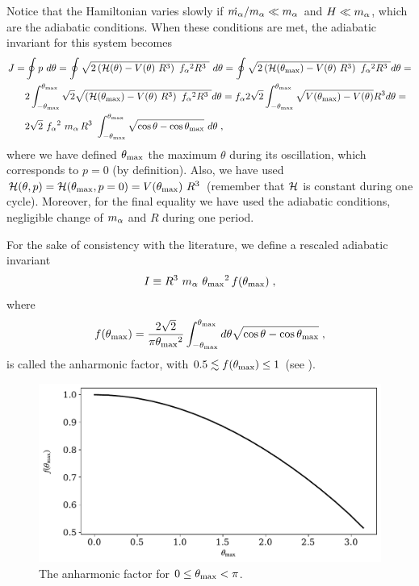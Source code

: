 \documentclass[11pt,a4paper]{article}
\begin{document}
Notice that the Hamiltonian varies slowly if $\dot {m_\alpha{}}/m_\alpha{} \ll m_\alpha{}$ and $H \ll m_\alpha{}$, which are the adiabatic conditions.   When these conditions are met, the adiabatic invariant for this system becomes
%
\begin{eqnarray}
	J = & \oint p \ d \theta = \oint \sqrt{ 2\lrb{ \Ham(\theta) - V(\theta) \ R^3} \ \fa^2 R^3 \ }  \ d \theta  =
	\oint \sqrt{ 2\lrb{ \Ham(\thetamax) - V(\theta) \ R^3} \ \fa^2 R^3 \ } d \theta = \nonumber \\ 
	& 2 \int_{- \thetamax} ^{\thetamax}  \sqrt{2}\sqrt{ \lrb{ \Ham(\thetamax) - V(\theta) \ R^3} \ \fa^2 R^3 \ } d \theta =
	\fa 2 \sqrt{2} \int_{- \thetamax} ^{\thetamax}  \sqrt{ V(\theta_{\rm max}) - V(\theta) } R^{3} d \theta = \nonumber \\
	&2\sqrt{2} \ \fa^2 \ \ma \, R^3 \ \dint_{- \thetamax}^{\thetamax} \sqrt{\cos \theta - \cos \thetamax} \ d \theta  
	\;,
	\label{eq:J_axion_derivation}
\end{eqnarray}
%
where we have defined $\theta_{\rm max}{}$ the maximum $\theta$ during its oscillation, which corresponds to $p=0$ (by definition). Also, we have used $\mathcal{H}(\theta,p) = \mathcal{H}(\theta_{\rm max}{},p=0) =  V(\theta_{\rm max}{}) \ R^3$ (remember that $\mathcal{H}$ is constant during one cycle). Moreover, for the final equality we have used the adiabatic conditions, \ie negligible change of $m_\alpha{}$ and $R$ during one period.
%

For the sake of consistency with the literature, we define a rescaled adiabatic invariant 
%
\begin{equation}
	I \equiv R^3 \ \ma \ \thetamax^2  \, f(\thetamax)  \;,
	\label{eq:J_axion_def}
\end{equation}
%
where 
\begin{equation}
	f(\theta_{\rm max}{}) =\dfrac{ 2 \sqrt{2}}{\pi \theta_{\rm max}{}^2 } \displaystyle \int_{- \theta_{\rm max}{}}^{\theta_{\rm max}{}} d \theta \sqrt{ \cos \theta - \cos \theta_{\rm max}{} } \;,
	\label{eq:anharmonic_f}
\end{equation}
%
is called the anharmonic factor, with $ 0.5 \lesssim f(\theta_{\rm max}{}) \leq 1$ (see ).


\begin{figure}[t]
	\includegraphics[width=1\textwidth]{figs/anharmonic_factor.pdf}
	\caption{The anharmonic factor for $0 \leq \theta_{\rm max}{} < \pi $.}
	\label{fig:anharmonic_factor}
\end{figure}
\end{document}
